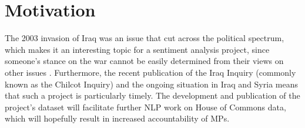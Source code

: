 \documentclass[12pt,a4paper,twoside,openright]{report}
\begin{document}
\section{Motivation}

The 2003 invasion of Iraq was an issue that cut across the political spectrum, which makes it an interesting topic for a sentiment analysis project, since someone's stance on the war cannot be easily determined from their views on other issues \cite{mp_votes_bbc}. Furthermore, the recent publication of the Iraq Inquiry (commonly known as the Chilcot Inquiry) \cite{chilcot2016report} and the ongoing situation in Iraq and Syria \cite{syria_iraq_air_strikes} means that such a project is particularly timely.
\newline
The development and publication of the project's dataset will facilitate further NLP work on House of Commons data, which will hopefully result in increased accountability of MPs.
\end{document}
